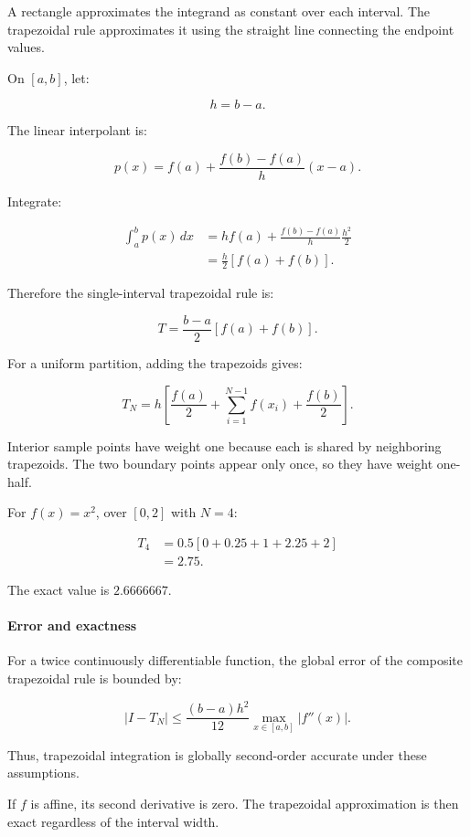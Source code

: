 A rectangle approximates the integrand as constant over each interval. The trapezoidal rule approximates it using the straight line connecting the endpoint values.

On \([a,b]\), let:

\[
h=b-a.
\]

The linear interpolant is:

\[
p(x)= f(a)+ \frac{f(b)-f(a)}h(x-a).
\]

Integrate:

\[
\begin{aligned} \int_a^b p(x)\,dx &=hf(a)+ \frac{f(b)-f(a)}h\frac{h^2}{2}\\ &=\frac h2[f(a)+f(b)]. \end{aligned}
\]

Therefore the single-interval trapezoidal rule is:

\[
\boxed{ T=\frac{b-a}{2}[f(a)+f(b)] }.
\]

For a uniform partition, adding the trapezoids gives:

\[
\boxed{ T_N= h\left[ \frac{f(a)}2+ \sum_{i=1}^{N-1}f(x_i)+ \frac{f(b)}2 \right] }.
\]

Interior sample points have weight one because each is shared by neighboring trapezoids. The two boundary points appear only once, so they have weight one-half.

For \(f(x)=x^2\), over \([0,2]\) with \(N=4\):

\[
\begin{aligned} T_4 &=0.5[ 0+0.25+1+2.25+2 ]\\ &=\boxed{2.75}. \end{aligned}
\]

The exact value is \(2.6666667\).

\paragraph{Error and exactness}\label{02-foundations-ii-ch022-error-and-exactness}

For a twice continuously differentiable function, the global error of the composite trapezoidal rule is bounded by:

\[
\boxed{ |I-T_N| \le \frac{(b-a)h^2}{12} \max_{x\in[a,b]}|f''(x)| }.
\]

Thus, trapezoidal integration is globally second-order accurate under these assumptions.

If \(f\) is affine, its second derivative is zero. The trapezoidal approximation is then exact regardless of the interval width.

